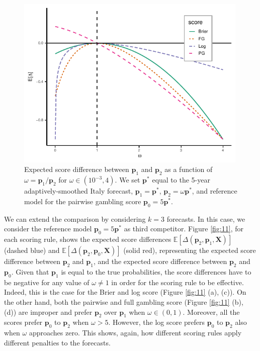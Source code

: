 \documentclass[referee,sn-basic]{sn-jnl}
\theoremstyle{thmstyleone}%
\theoremstyle{thmstyletwo}%
\theoremstyle{thmstylethree}%
\begin{document}
\begin{figure}
  \includegraphics[width = 0.99\textwidth]{figure10.pdf}
\caption{Expected score difference between $\mathbf p_1$ and $\mathbf p_2$ as a function of $\omega = \mathbf p_1/\mathbf p_2$ for $\omega \in (10^{-3}, 4)$. We set $\mathbf p^*$ equal to the 5-year adaptively-smoothed Italy forecast, $\mathbf p_1 = \mathbf p^*$, $\mathbf p_2 = \omega \mathbf p^*$, and reference model for the pairwise gambling score $\mathbf p_0 = 5\mathbf p^*$.}
\label{fig:10}
\end{figure}

We can extend the comparison by considering $k = 3$ forecasts. In this case, we consider the reference model $\mathbf p_0 = 5\mathbf p^*$ as third competitor. Figure \ref{fig:11}, for each scoring rule, shows the expected score differences $\mathbb E[\Delta(\mathbf p_2, \mathbf p_1, \mathbf X)]$ (dashed blue) and $\mathbb E[\Delta(\mathbf p_2, \mathbf p_0, \mathbf X)]$ (solid red), representing the expected score difference between $\mathbf p_2$ and $\mathbf p_1$, and the expected score difference between $\mathbf p_2$ and $\mathbf p_0$. Given that $\mathbf p_1$ is equal to the true probabilities, the score differences have to be negative for any value of $\omega \neq 1$ in order for the scoring rule to be effective. Indeed, this is the case for the Brier and log score (Figure \ref{fig:11} (a), (c)). On the other hand, both the pairwise and full gambling score (Figure \ref{fig:11} (b), (d)) are improper and prefer $\mathbf p_2$ over $\mathbf p_1$ when $\omega \in (0,1)$. Moreover, all the scores prefer $\mathbf p_0$ to $\mathbf p_2$ when $\omega > 5$. However, the log score prefers $\mathbf p_0$ to $\mathbf p_2$ also when $\omega$ approaches zero. This shows, again, how different scoring rules apply different penalties to the forecasts.
\end{document}
